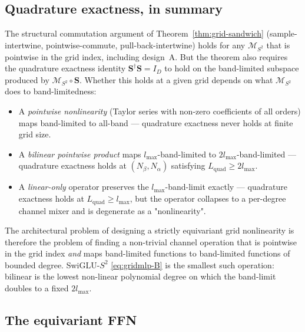 \documentclass[11pt,a4paper]{article}
\newcommand{\Sph}{S^2}
\newcommand{\lmax}{l_{\max}}
\theoremstyle{plain}
\theoremstyle{definition}
\theoremstyle{remark}
\begin{document}
\subsection{Quadrature exactness, in summary}\label{sec:quad}

The structural commutation argument of Theorem~\ref{thm:grid-sandwich}
(sample-intertwine, pointwise-commute, pull-back-intertwine) holds for any
$\mathcal{M}_{\Sph}$ that is pointwise in the grid index, including design~A.
But the theorem also requires the quadrature exactness identity
$\bm{S}^{\dagger}\bm{S}=I_D$ to hold on the band-limited subspace produced by
$\mathcal{M}_{\Sph}\circ\bm{S}$. Whether this holds at a given grid depends on
what $\mathcal{M}_{\Sph}$ does to band-limitedness:
\begin{itemize}[leftmargin=2em]
    \item A \emph{pointwise nonlinearity} (Taylor series with non-zero coefficients of
          all orders) maps band-limited to all-band — quadrature exactness never holds at
          finite grid size.
    \item A \emph{bilinear pointwise product} maps $\lmax$-band-limited to
          $2\lmax$-band-limited — quadrature exactness holds at $(N_\beta,N_\alpha)$
          satisfying $L_{\mathrm{quad}}\ge 2\lmax$.
    \item A \emph{linear-only} operator preserves the $\lmax$-band-limit exactly —
          quadrature exactness holds at $L_{\mathrm{quad}}\ge\lmax$, but the operator
          collapses to a per-degree channel mixer and is degenerate as a "nonlinearity".
\end{itemize}
The architectural problem of designing a strictly equivariant grid nonlinearity is therefore the problem of finding a non-trivial channel operation that is pointwise in the grid index \emph{and} maps band-limited functions to band-limited functions of bounded degree.
SwiGLU-$\Sph$ \eqref{eq:gridmlp-B} is the smallest such operation: bilinear is the lowest non-linear polynomial degree on which the band-limit doubles to a fixed $2\lmax$.

\subsection{The equivariant FFN}\label{sec:effn}
\end{document}
